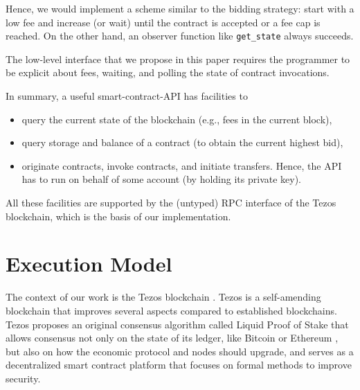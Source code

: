 \documentclass[a4paper]{llncs}
\begin{document}
Hence, we would implement a scheme similar to
the bidding strategy: start with a low fee and increase (or wait) until the
contract is accepted or a fee cap is reached. On the other hand, an
observer function like \lstinline/get_state/ always succeeds.

The low-level interface that we propose in this paper requires the
programmer to be explicit about fees, waiting, and polling the state
of contract invocations. 

In summary, a useful smart-contract-API  has facilities to
\begin{itemize}
\item query the current state of the blockchain (e.g., fees in the
  current block),
\item query storage and balance of a contract (to obtain
  the current highest bid),
\item originate contracts, invoke contracts, and initiate
  transfers. Hence, the API has to run on
  behalf of some account (by holding its private key).
\end{itemize}
All these facilities are supported by the (untyped) RPC interface of the Tezos
blockchain, which is the basis of our implementation. 

\section{Execution Model}
\label{sec:execution-model}
The context of our work is the Tezos blockchain \cite{tezos-whitepaper,tezos-intropaper}. Tezos is a self-amending blockchain that improves several aspects compared to established blockchains. Tezos proposes an original consensus algorithm called Liquid Proof of Stake that allows consensus not only on the state of its ledger, like Bitcoin \cite{bitcoin-whitepaper} or Ethereum \cite{eth-whitepaper}, but also on how the economic protocol and nodes should upgrade, and serves as a decentralized smart contract platform that focuses on formal methods to improve security. 
\end{document}
